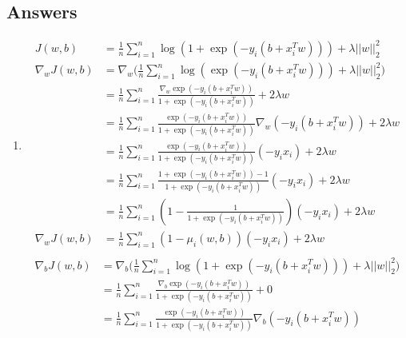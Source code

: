 \documentclass{article}
\begin{document}
\begin{sloppypar}
\begin{aprob}
    \subsection{Answers}
    \begin{enumerate}
        \item 
            \begin{align*}
                J(w,b) &= \frac{1}{n} \sum_{i=1}^n \log( 1 + \exp(-y_i (b + x_i^T w))) + \lambda ||w||_2^2 \\
                \nabla_w J(w,b) &= \nabla_w \Big (\frac{1}{n} \sum_{i=1}^n \log(\exp(-y_i (b + x_i^T w))) + \lambda ||w||_2^2 \Big)\\
                &= \frac{1}{n} \sum_{i=1}^n \frac{\nabla_w \exp(-y_i (b + x_i^T w))}{1 + \exp(-y_i (b + x_i^T w))} + 2 \lambda w\\
                &= \frac{1}{n} \sum_{i=1}^n \frac{\exp(-y_i (b + x_i^T w))}{1 + \exp(-y_i (b + x_i^T w))} \nabla_w(-y_i (b + x_i^T w)) + 2 \lambda w \\
                &= \frac{1}{n} \sum_{i=1}^n \frac{\exp(-y_i (b + x_i^T w))}{1 + \exp(-y_i (b + x_i^T w))} (-y_i x_i) + 2 \lambda w \\
                &= \frac{1}{n} \sum_{i=1}^n \frac{1+\exp(-y_i (b + x_i^T w)) -1}{1 + \exp(-y_i (b + x_i^T w))} (-y_i x_i) + 2 \lambda w \\
                &= \frac{1}{n} \sum_{i=1}^n (1 - \frac{1}{1 + \exp(-y_i (b + x_i^T w))} )(-y_i x_i) + 2\lambda w \\
                \nabla_w J(w,b) &= \frac{1}{n} \sum_{i=1}^n (1 - \mu_i(w, b)) (-y_i x_i) + 2\lambda w \\
            \end{align*} 
            \begin{align*}
                \nabla_b J(w,b) &= \nabla_b \Big (\frac{1}{n} \sum_{i=1}^n \log( 1 + \exp(-y_i (b + x_i^T w))) + \lambda ||w||_2^2 \Big)\\
                &= \frac{1}{n} \sum_{i=1}^n \frac{\nabla_b \exp(-y_i (b + x_i^T w))}{1 + \exp(-y_i (b + x_i^T w))} + 0\\
                &= \frac{1}{n} \sum_{i=1}^n \frac{\exp(-y_i (b + x_i^T w))}{1 + \exp(-y_i (b + x_i^T w))} \nabla_b(-y_i (b + x_i^T w)) \\

\end{align*}
\end{enumerate}
\end{aprob}
\end{sloppypar}
\end{document}
